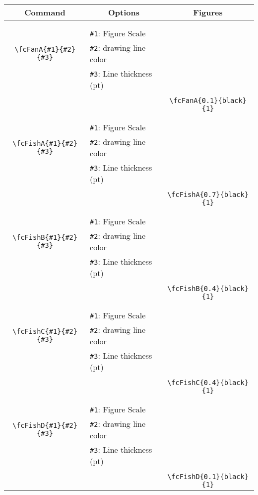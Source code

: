 \documentclass[x11names]{article}
\begin{document}
\begin{table}[H]\centering\begin{tabular}{|c|l|c|}\hline {\bf Command}& \multicolumn{1}{c|}{{\bf Options}} & {\bf Figures}\\  \hline	&&\multirow{5}{*}{\fcFanA{0.1}{black}{1}}\\	&&\\	&\verb|#1|: Figure Scale &\\	\verb|\fcFanA{#1}{#2}{#3}|&	\verb|#2|: drawing line color &\\	&\verb|#3|: Line thickness (pt) &\\ &&\\&&	\verb|\fcFanA{0.1}{black}{1}|\\\hline 	
	&&\multirow{5}{*}{\fcFishA{0.7}{black}{1}}\\	&&\\	&\verb|#1|: Figure Scale &\\	\verb|\fcFishA{#1}{#2}{#3}|&	\verb|#2|: drawing line color &\\	&\verb|#3|: Line thickness (pt) &\\ &&\\&&	\verb|\fcFishA{0.7}{black}{1}|\\\hline 	
	&&\multirow{5}{*}{\fcFishB{0.4}{black}{1}}\\	&&\\	&\verb|#1|: Figure Scale &\\	\verb|\fcFishB{#1}{#2}{#3}|&	\verb|#2|: drawing line color &\\	&\verb|#3|: Line thickness (pt) &\\ &&\\&&	\verb|\fcFishB{0.4}{black}{1}|\\\hline 	
	&&\multirow{5}{*}{\fcFishC{0.4}{black}{1}}\\	&&\\	&\verb|#1|: Figure Scale &\\	\verb|\fcFishC{#1}{#2}{#3}|&	\verb|#2|: drawing line color &\\	&\verb|#3|: Line thickness (pt) &\\ &&\\&&	\verb|\fcFishC{0.4}{black}{1}|\\\hline 	
	&&\multirow{5}{*}{\fcFishD{0.1}{black}{1}}\\	&&\\	&\verb|#1|: Figure Scale &\\	\verb|\fcFishD{#1}{#2}{#3}|&	\verb|#2|: drawing line color &\\	&\verb|#3|: Line thickness (pt) &\\ &&\\&&	\verb|\fcFishD{0.1}{black}{1}|\\\hline 	

\end{tabular}
\end{table}
\end{document}
